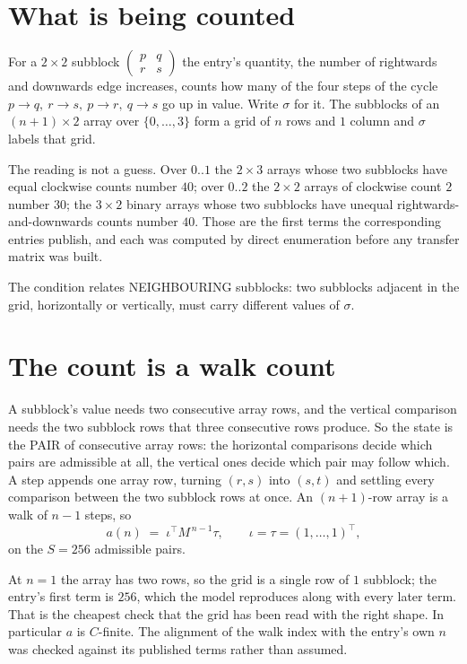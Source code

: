 \documentclass[11pt,a4paper]{article}
\theoremstyle{plain}
\theoremstyle{definition}
\begin{document}
\section{What is being counted}

For a $2\times2$ subblock $\begin{pmatrix}p&q\\r&s\end{pmatrix}$ the
entry's quantity, the number of rightwards and downwards edge increases, counts how many of the four steps of the cycle $p\to q,\ r\to s,\ p\to r,\ q\to s$ go up in value. Write $\sigma$ for it. The subblocks of an
$(n+1)\times2$ array over $\{0,\dots,3\}$ form a grid of $n$ rows and $1$
column and $\sigma$ labels that grid.

The reading is not a guess. Over $0..1$ the $2\times3$ arrays whose two subblocks have equal
clockwise counts number $40$; over $0..2$ the $2\times2$ arrays of clockwise count $2$ number
$30$; the $3\times2$ binary arrays whose two subblocks have unequal rightwards-and-downwards
counts number $40$. Those are the first terms the corresponding entries publish, and each was
computed by direct enumeration before any transfer matrix was built.

The condition relates NEIGHBOURING subblocks: two subblocks adjacent in the grid, horizontally
or vertically, must carry different values of $\sigma$.

\section{The count is a walk count}

A subblock's value needs two consecutive array rows, and the vertical
comparison needs the two subblock rows that three consecutive rows produce. So the state is the
PAIR of consecutive array rows: the horizontal comparisons decide which pairs are admissible at
all, the vertical ones decide which pair may follow which. A step appends one array row,
turning $(r,s)$ into $(s,t)$ and settling every comparison between the two subblock rows at
once. An $(n+1)$-row array is a walk of $n-1$ steps, so
\[
a(n)\;=\;\iota^{\!\top}M^{\,n-1}\tau,\qquad\iota=\tau=(1,\dots,1)^{\!\top},
\]
on the $S=256$ admissible pairs.

At $n=1$ the array has two rows, so the grid is a single row of $1$
subblock; the entry's first term is $256$, which the model
reproduces along with every later term. That is the cheapest check that the grid has been read
with the right shape.
In particular $a$ is $C$-finite. The alignment of the walk index with the entry's own $n$ was
checked against its published terms rather than assumed.
\end{document}
